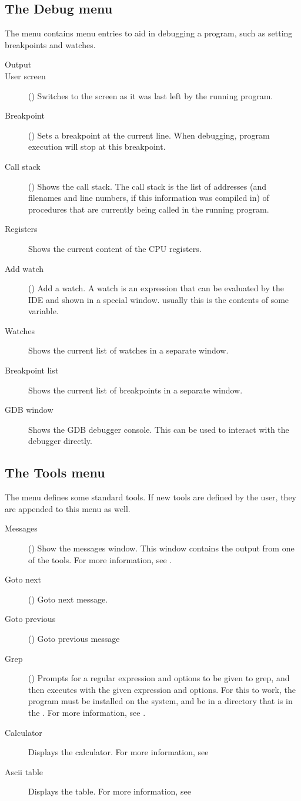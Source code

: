 \subsection{The Debug menu}
\label{se:menudebug}
The  menu contains menu entries to aid in debugging a program, such as
setting breakpoints and watches. 
\begin{description}
\item[Output]
\item[User screen] ()
Switches to the screen as it was last left by the running program.
\item[Breakpoint] ()
Sets a breakpoint at the current line. When debugging, program execution
will stop at this breakpoint.
\item[Call stack] ()
Shows the call stack. The call stack is the list of addresses (and
filenames and line numbers, if this information was compiled in) of 
procedures that are currently being called in the running program.
\item[Registers]
Shows the current content of the CPU registers. 
\item[Add watch] () Add a watch. A watch is an expression
that can be evaluated by the IDE and shown in a special window. usually this
is the contents of some variable. 
\item[Watches]
Shows the current list of watches in a separate window.
\item[Breakpoint list]
Shows the current list of breakpoints in a separate window.
\item[GDB window]
Shows the GDB debugger console. This can be used to interact with the debugger
directly.
\end{description}
%
%
\subsection{The Tools menu}
\label{se:menutools}
The  menu defines some standard tools. If new tools are defined by the
user, they are appended to this menu as well.
\begin{description}
\item[Messages] () Show the messages window. 
This window contains the output from one of the tools. For more information,
see .
\item[Goto next] () Goto next message.
\item[Goto previous] () Goto previous message
\item[Grep] () Prompts for a regular expression and options
to be given to grep, and then executes  with the given expression and
options. For this to work, the  program must be installed on the
system, and be in a directory that is in the . For more
information, see .
\item[Calculator] 
Displays the calculator. For more information, see 
\item[Ascii table] Displays the  table. For more information, see
\end{description}
%
%
